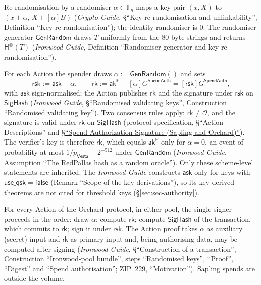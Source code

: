\documentclass[11pt,a4paper]{article}
\theoremstyle{definition}
\newcommand{\F}{\mathbb{F}}
\newcommand{\PP}{\mathbb{P}}
\newcommand{\Fq}{\F_q}
\newcommand{\rk}{\mathsf{rk}}
\newcommand{\Vesta}{\ensuremath{\mathsf{Vesta}}}
\newcommand{\ask}{\ensuremath{\mathsf{ask}}}
\newcommand{\aksym}{\ensuremath{\mathsf{ak}}}
\newcommand{\rsk}{\ensuremath{\mathsf{rsk}}}
\begin{document}
Re-randomisation by a randomiser \(\alpha \in \Fq\) maps a key pair
\((x, X)\) to \((x + \alpha,\, X + [\alpha]B)\) (\emph{Crypto Guide},
\S``Key re-randomisation and unlinkability'', Definition ``Key
re-randomisation''); the identity randomiser is \(0\). The randomiser
generator \(\mathsf{GenRandom}\) draws \(T\) uniformly from the \(80\)-byte
strings and returns \(\mathsf{H}^{\circledast}(T)\) (\emph{Ironwood Guide},
Definition ``Randomiser generator and key re-randomisation'').

For each Action the spender draws \(\alpha := \mathsf{GenRandom}()\) and sets
\[
  \rsk := \ask + \alpha , \qquad
  \rk := \aksym^{\PP} + [\alpha]G^{\mathsf{SpendAuth}}
    = [\rsk]G^{\mathsf{SpendAuth}} ,
\]
with \(\ask\) sign-normalised; the Action publishes \(\rk\) and the
signature under \(\rsk\) on \(\mathsf{SigHash}\) (\emph{Ironwood Guide},
\S``Randomised validating keys'', Construction ``Randomised validating
key''). Two consensus rules apply: \(\rk \ne \mathcal{O}\), and the
signature is valid under \(\rk\) on \(\mathsf{SigHash}\) (protocol
specification, \S``Action Descriptions'' and
\href{https://zips.z.cash/protocol/protocol.pdf\#spendauthsig}%
{\S``Spend Authorization Signature (Sapling and Orchard)''}). The verifier's
key is therefore \(\rk\), which equals \(\aksym^{\PP}\) only for
\(\alpha = 0\), an event of probability at most
\(1/p_{\Vesta} + 2^{-512}\) under \(\mathsf{GenRandom}\) (\emph{Ironwood
Guide}, Assumption ``The RedPallas hash as a random oracle''). Only these
scheme-level statements are inherited. The \emph{Ironwood Guide} constructs
\(\ask\) only for keys with \(\mathsf{use\_qsk} = \mathsf{false}\) (Remark
``Scope of the key derivations''), so its key-derived theorems are not cited
for threshold keys (\S\ref{sec:sec-authority}).

For every Action of the Orchard protocol, in either pool, the single signer
proceeds in the order: draw \(\alpha\); compute \(\rk\); compute
\(\mathsf{SigHash}\) of the transaction, which commits to \(\rk\); sign it
under \(\rsk\). The Action proof takes \(\alpha\) as auxiliary (secret)
input and \(\rk\) as primary input and, being authorising data, may be
computed after signing (\emph{Ironwood Guide}, \S``Construction of a
transaction'', Construction ``Ironwood-pool bundle'', steps ``Randomised
keys'', ``Proof'', ``Digest'' and ``Spend authorisation''; ZIP~229,
``Motivation''). Sapling spends are outside the volume.
\end{document}
